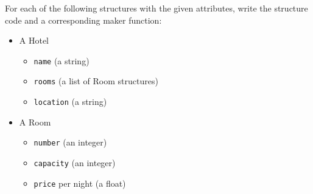 For each of the following structures with the given attributes,
write the structure code and a corresponding maker function:
\begin{itemize}
	\item A Hotel
	\begin{itemize}
		\item \texttt{name} (a string)
		\item \texttt{rooms} (a list of Room structures)
		\item \texttt{location} (a string)
	\end{itemize}
	\item A Room
	\begin{itemize}
		\item \texttt{number} (an integer)
		\item \texttt{capacity} (an integer)
		\item \texttt{price} per night (a float)
	\end{itemize}
\end{itemize}

\small
\begin{answer}
	
\end{answer}
\normalsize

\vspace{12pt}
